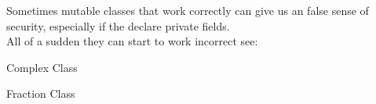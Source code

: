 \begin{sectionbox}\nospacing
  Sometimes mutable classes that work correctly can give us an false sense of
  security, especially if the declare private fields.\\
  All of a sudden they can start to work incorrect see:
  \begin{itemizenosep}
      \item Complex Class
      \item Fraction Class
  \end{itemizenosep}
\end{sectionbox}

